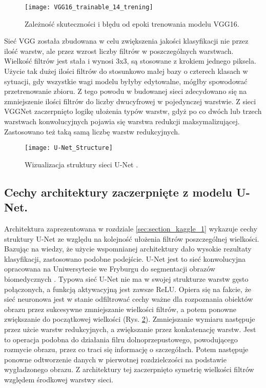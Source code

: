 {\begin{figure}[h!]
	\centering
	\centering
		\texttt{[image: VGG16\_trainable\_14\_trening]}	
	\caption{Zależność skuteczności i błędu od epoki trenowania modelu VGG16.}
	\label{fig:VGG16_trainable_14_trening}
\end{figure}

Sieć VGG została zbudowana w celu zwiększenia jakości klasyfikacji nie przez ilość warstw, ale przez wzrost liczby filtrów w poszczególnych warstwach. Wielkość filtrów jest stała i wynosi 3x3, są stosowane z krokiem jednego piksela. Użycie tak dużej ilości filtrów do stosunkowo małej bazy o czterech klasach w sytuacji, gdy wszystkie wagi modelu byłyby edytowalne, mógłby spowodować przetrenowanie zbioru. Z tego powodu w budowanej sieci zdecydowano się na zmniejszenie ilości filtrów do liczby dwucyfrowej w pojedynczej warstwie. Z sieci VGGNet zaczerpnięto logikę ułożenia typów warstw, gdyż po co dwóch lub trzech warstwach konwolucyjnych pojawia się warstwa redukcji maksymalizującej. Zastosowano też taką samą liczbę warstw redukcyjnych.

\begin{figure}[h!]
	\centering
	\centering
		\texttt{[image: U-Net\_Structure]}	
	\caption{Wizualizacja struktury sieci U-Net \cite{Silburt2019LunarCI}.}
	\label{fig:u-net_structure}
\end{figure}

}

\subsection{Cechy architektury zaczerpnięte z modelu U-Net.}

Architektura zaprezentowana w rozdziale \ref{sec:section_kaggle_1} wykazuje cechy struktury U-Net ze względu na kolejność ułożenia filtrów poszczególnej wielkości. Bazując na wiedzy, że użycie wspomnianej architektury dało wysokie rezultaty klasyfikacji, zastosowano podobne podejście. U-Net jest to sieć konwolucyjna opracowana na Uniwersytecie we Fryburgu do segmentacji obrazów biomedycznych \cite{Ronneberger2015UNetCN}. Typowa sieć U-Net nie ma w swojej strukturze warstw gęsto połączonych, a funkcją aktywacyjną jest zawsze ReLU. Opiera się na fakcie, że sieć neuronowa jest w stanie odfiltrować cechy ważne dla rozpoznania obiektów obrazu przez sukcesywne zmniejszanie wielkości filtrów, a potem ponowne zwiększanie do początkowej wielkości (Rys. \ref{fig:u-net_structure}). Zmniejszanie wymiaru następuje przez użcie warstw redukcyjnych, a zwiększanie przez konkatenację warstw. Jest to operacja podobna do działania filru dolnoprzepustowego, powodującego rozmycie obrazu, przez co traci się informację o szczegółach. Potem następuje ponowne odtworzenie danych w pierwotnej rozdzielczości na podstawie wygładzonego obrazu. Z architektury tej zaczerpnięto symetrię wielkości filtrów względem środkowej warstwy sieci.

